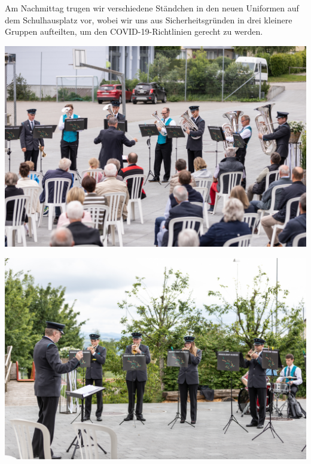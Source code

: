 \begin{history}
    Am Nachmittag trugen wir verschiedene Ständchen in den neuen Uniformen auf
    dem Schulhausplatz vor, wobei wir uns aus Sicherheitsgründen in drei
    kleinere Gruppen aufteilten, um den COVID-19-Richtlinien gerecht zu werden.

    \begin{MulticolFigure}
        \centering
        \includegraphics[width=0.93\linewidth]{./chap/2001-2024/2021/Ensemble-1.jpg}
    \end{MulticolFigure}


    \begin{MulticolFigure}
        \centering
        \includegraphics[width=0.93\linewidth]{./chap/2001-2024/2021/Ensemble-2.jpg}
    \end{MulticolFigure}


\end{history}
